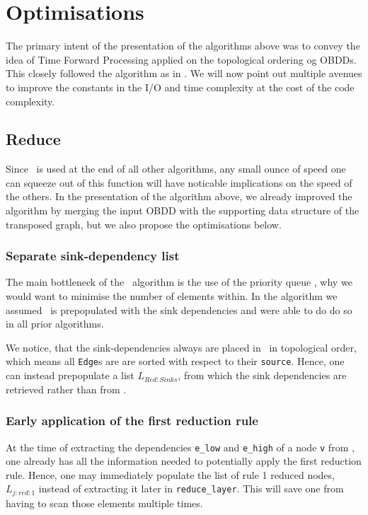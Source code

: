 \section{Optimisations} \label{sec:optimisations}
The primary intent of the presentation of the algorithms above was to convey the
idea of Time Forward Processing applied on the topological ordering og OBDDs.
This closely followed the algorithm as in \cite{Arge96}. We will now point out
multiple avenues to improve the constants in the I/O and time complexity at the
cost of the code complexity.

\subsection{Reduce}
Since \Reduce\ is used at the end of all other algorithms, any small ounce of
speed one can squeeze out of this function will have noticable implications on
the speed of the others. In the presentation of the algorithm above, we already
improved the algorithm by merging the input OBDD with the supporting data
structure of the transposed graph, but we also propose the optimisations below.

\subsubsection{Separate sink-dependency list}
The main bottleneck of the \Reduce\ algorithm is the use of the priority queue
\ReduceQdep, why we would want to minimise the number of elements within. In the
algorithm we assumed \ReduceQdep\ is prepopulated with the sink dependencies and
were able to do do so in all prior algorithms.

We notice, that the sink-dependencies always are placed in \ReduceQdep\ in
topological order, which means all \lstinline{Edge}s are are sorted with respect
to their \lstinline{source}. Hence, one can instead prepopulate a list
$L_{\mathit{Red:}Sinks}$, from which the sink dependencies are retrieved rather
than from \ReduceQdep.


\subsubsection{Early application of the first reduction rule}
At the time of extracting the dependencies \lstinline{e_low} and
\lstinline{e_high} of a node \lstinline{v} from \ReduceQdep, one already has all
the information needed to potentially apply the first reduction rule. Hence, one
may immediately populate the list of rule 1 reduced nodes,
$L_{j:\mathit{red}:1}$ instead of extracting it later in
\lstinline{reduce_layer}. This will save one from having to scan those elements
multiple times.


